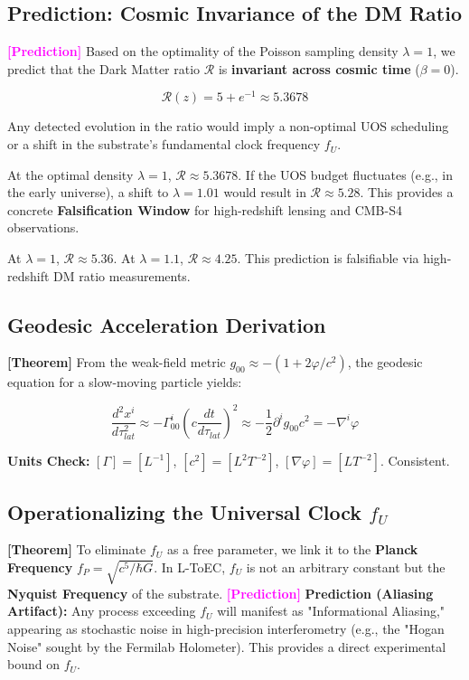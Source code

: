 \documentclass[11pt,titlepage]{article}
\newcommand{\tagtheo}{\textcolor{green!60!black}{\textbf{[Theorem]}} }
\newcommand{\tagpred}{\textcolor{magenta}{\textbf{[Prediction]}} }
\begin{document}
\subsection{Prediction: Cosmic Invariance of the DM Ratio}
\tagpred Based on the optimality of the Poisson sampling density $\lambda=1$, we predict that the Dark Matter ratio $\mathcal{R}$ is \textbf{invariant across cosmic time} ($\beta = 0$). 

\begin{equation}
\mathcal{R}(z) = 5 + e^{-1} \approx 5.3678
\end{equation}

Any detected evolution in the ratio would imply a non-optimal UOS scheduling or a shift in the substrate's fundamental clock frequency $f_U$.

At the optimal density $\lambda=1$, $\mathcal{R} \approx 5.3678$. If the UOS budget fluctuates (e.g., in the early universe), a shift to $\lambda=1.01$ would result in $\mathcal{R} \approx 5.28$. This provides a concrete \textbf{Falsification Window} for high-redshift lensing and CMB-S4 observations.

At $\lambda=1$, $\mathcal{R} \approx 5.36$. At $\lambda=1.1$, $\mathcal{R} \approx 4.25$. This prediction is falsifiable via high-redshift DM ratio measurements.

\subsection{Geodesic Acceleration Derivation}
\tagtheo From the weak-field metric $g_{00} \approx -(1 + 2\varphi/c^2)$, the geodesic equation for a slow-moving particle yields:

\begin{equation}
\frac{d^2 x^i}{d\tau_{lat}^2} \approx -\Gamma^i_{00} (c \frac{dt}{d\tau_{lat}})^2 \approx -\frac{1}{2} \partial^i g_{00} c^2 = -\nabla^i \varphi
\end{equation}

\textbf{Units Check:} $[\Gamma] = [L^{-1}]$, $[c^2] = [L^2 T^{-2}]$, $[\nabla \varphi] = [L T^{-2}]$. Consistent.


\subsection{Operationalizing the Universal Clock $f_U$}
\tagtheo To eliminate $f_U$ as a free parameter, we link it to the \textbf{Planck Frequency} $f_P = \sqrt{c^5 / \hbar G}$. In L-ToEC, $f_U$ is not an arbitrary constant but the \textbf{Nyquist Frequency} of the substrate. 
\tagpred \textbf{Prediction (Aliasing Artifact):} Any process exceeding $f_U$ will manifest as "Informational Aliasing," appearing as stochastic noise in high-precision interferometry (e.g., the "Hogan Noise" sought by the Fermilab Holometer). This provides a direct experimental bound on $f_U$.
\end{document}
